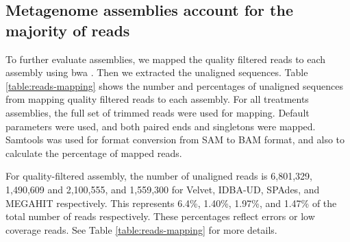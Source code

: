 %




\subsection*{Metagenome assemblies account for the majority of reads}
To further evaluate assemblies, we mapped the quality filtered reads to each assembly using bwa \cite{bwa-mem}.  Then we extracted the unaligned sequences. Table \ref{table:reads-mapping} shows the number and percentages of unaligned sequences from mapping quality filtered reads to each assembly. For all treatments assemblies, the full set of trimmed reads were used for mapping. Default parameters were used, and both paired ends and singletons were mapped.  Samtools  \cite{samtools} was used for format conversion from SAM to BAM format, and also to calculate the percentage of mapped reads.  


For quality-filtered assembly, the number of unaligned reads is 6,801,329, 1,490,609 and 2,100,555, and 1,559,300 for Velvet, IDBA-UD, SPAdes, and MEGAHIT respectively. This represents 6.4\%, 1.40\%, 1.97\%, and 1.47\% of the total number of reads respectively. These percentages reflect errors or low coverage reads. See Table \ref{table:reads-mapping} for more details. 


